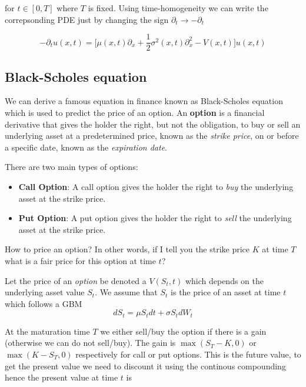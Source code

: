 \documentclass[11pt,a4paper]{article}
\begin{document}
for $t\in [0,T]$ where $T$ is fixed. Using time-homogeneity we can write the correpsonding PDE just by changing the sign $\partial_t \to -\partial_t$

\begin{equation}
    -\partial_t u(x,t) =  \Biggl[\mu(x,t)\partial_x + \frac{1}{2}\sigma^{2}(x,t)\partial^2_x-V(x,t)\Biggl]u(x,t)
\end{equation}


\subsection{Black-Scholes equation}

We can derive a famous equation in finance known as Black-Scholes equation which is used to predict the price of an option.
An \textbf{option} is a financial derivative that gives the holder the right, but not the obligation, to buy or sell an underlying asset at a predetermined price, known as the \textit{strike price}, on or before a specific date, known as the \textit{expiration date}.

There are two main types of options:

\begin{itemize}
    \item \textbf{Call Option}: A call option gives the holder the right to \textit{buy} the underlying asset at the strike price.
    \item \textbf{Put Option}: A put option gives the holder the right to \textit{sell} the underlying asset at the strike price.
\end{itemize}

How to price an option? In other words, if I tell you the strike price $K$ at time $T$ what is a fair price for this option at time $t$?

Let the price of an \textit{option} be denoted a $V(S_t,t)$ which depends on the underlying asset value $S_t$. We assume that $S_t$ is the price of an asset at time $t$ which follows a GBM
\begin{equation}
dS_t = \mu S_t dt + \sigma S_t dW_t    
\end{equation}

At the maturation time $T$ we either sell/buy the option if there is a gain (otherwise we can do not sell/buy). The gain is $\max(S_T-K,0)$ or $\max(K-S_T,0)$ respectively for call or put options. This is the future value, to get the present value we need to discount it using the continous compounding hence the present value at time $t$ is
\end{document}
